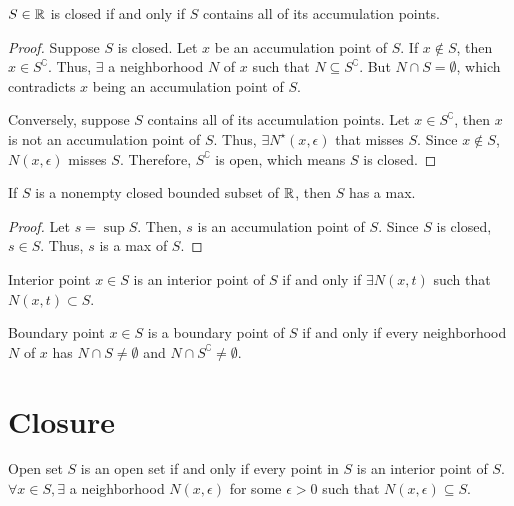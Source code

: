 \begin{theorem}{}{}
    $S \in \mathbb{R}$ is closed if and only if $S$ contains all of its accumulation points.
\end{theorem}
\begin{proof}
    Suppose $S$ is closed. Let $x$ be an accumulation point of $S$. If $x \not\in S$, then $x \in S^\complement$. Thus, $\exists$ a neighborhood $N$ of $x$ such that $N \subseteq S^\complement$. But $N \cap S = \emptyset$, which contradicts $x$ being an accumulation point of $S$.

    Conversely, suppose $S$ contains all of its accumulation points. Let $x \in S^\complement$, then $x$ is not an accumulation point of $S$. Thus, $\exists N^\star(x, \epsilon)$ that misses $S$. Since $x \not\in S$, $N(x, \epsilon)$ misses $S$. Therefore, $S^\complement$ is open, which means $S$ is closed.
\end{proof}

\begin{theorem}{}{}
    If $S$ is a nonempty closed bounded subset of $\mathbb{R}$, then $S$ has a max.
\end{theorem}
\begin{proof}
    Let $s = \sup S$. Then, $s$ is an accumulation point of $S$. Since $S$ is closed, $s \in S$. Thus, $s$ is a max of $S$.
\end{proof}

\begin{definition}{Interior point}{}
    $x \in S$ is an interior point of $S$ if and only if $\exists N(x, t)$ such that $N(x, t) \subset S$.
\end{definition}

\begin{definition}{Boundary point}{}
    $x \in S$ is a boundary point of $S$ if and only if every neighborhood $N$ of $x$ has $N \cap S \neq \emptyset$ and $N \cap S^\complement \neq \emptyset$.
\end{definition}

\section{Closure}
\begin{definition}{Open set}{}
    $S$ is an open set if and only if every point in $S$ is an interior point of $S$. $\forall x \in S, \exists$ a neighborhood $N(x, \epsilon)$ for some $\epsilon > 0$ such that $N(x, \epsilon) \subseteq S$.
\end{definition}

